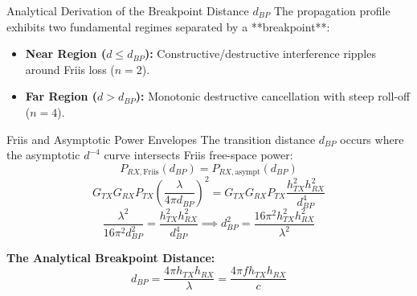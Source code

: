 \documentclass[aspectratio=169, 10pt]{beamer}
\begin{document}
\begin{frame}{Analytical Derivation of the Breakpoint Distance $d_{BP}$}
\small
    The propagation profile exhibits two fundamental regimes separated by a **breakpoint**:
    \begin{itemize}
        \item \textbf{Near Region ($d \le d_{BP}$):} Constructive/destructive interference ripples around Friis loss ($n = 2$).
        \item \textbf{Far Region ($d > d_{BP}$):} Monotonic destructive cancellation with steep roll-off ($n = 4$).
    \end{itemize}

    \begin{block}{Friis and Asymptotic Power Envelopes}
        The transition distance $d_{BP}$ occurs where the asymptotic $d^{-4}$ curve intersects Friis free-space power:
        \begin{equation}
            P_{RX, \text{Friis}}(d_{BP}) = P_{RX, \text{asympt}}(d_{BP})
        \end{equation}
        \begin{equation}
            G_{TX} G_{RX} P_{TX} \left(\frac{\lambda}{4\pi d_{BP}}\right)^2 = G_{TX} G_{RX} P_{TX} \frac{h_{TX}^2 h_{RX}^2}{d_{BP}^4}
        \end{equation}
        \begin{equation}
            \frac{\lambda^2}{16\pi^2 d_{BP}^2} = \frac{h_{TX}^2 h_{RX}^2}{d_{BP}^4} \implies d_{BP}^2 = \frac{16\pi^2 h_{TX}^2 h_{RX}^2}{\lambda^2}
        \end{equation}
    \end{block}

    \textbf{The Analytical Breakpoint Distance:}
    \begin{equation}
        \boxed{d_{BP} = \frac{4\pi h_{TX} h_{RX}}{\lambda} = \frac{4\pi f h_{TX} h_{RX}}{c}}
    \end{equation}
\end{frame}

\end{document}
